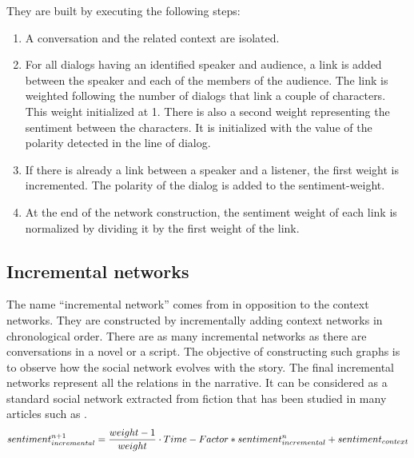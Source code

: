 \documentclass[a4paper, 12pt]{report}
\begin{document}
They are built by executing the following steps:
\begin{enumerate}
\item A conversation and the related context are isolated.
\item For all dialogs having an identified speaker and audience, a link is added between the speaker and each of the members of the audience. The link is weighted following the number of dialogs that link a couple of characters. This weight initialized at 1. There is also a second weight representing the sentiment between the characters. It is initialized with the value of the polarity detected in the line of dialog.
\item If there is already a link between a speaker and a listener, the first weight is incremented. The polarity of the dialog is added to the sentiment-weight.
\item At the end of the network construction, the sentiment weight of each link is normalized by dividing it by the first weight of the link.
\end{enumerate}

\subsection{Incremental networks}
The name ``incremental network'' comes from \cite{original} in opposition to the context networks. They are constructed by incrementally adding context networks in chronological order. There are as many incremental networks as there are conversations in a novel or a script. The objective of constructing such graphs is to observe how the social network evolves with the story.
The final incremental networks represent all the relations in the narrative. It can be considered as a standard social network extracted from fiction that has been studied in many articles such as \cite{agarwal-etal-2013-automatic, NER, character_country, movie, fiction, Dekker2018EvaluatingSN}.\\

\begin{equation}
sentiment_{incremental}^{n+1} = \frac{weight - 1}{weight} \cdot Time-Factor * sentiment_{incremental}^{n} + sentiment_{context}\\
\label{sentiment}
\end{equation}
\end{document}
